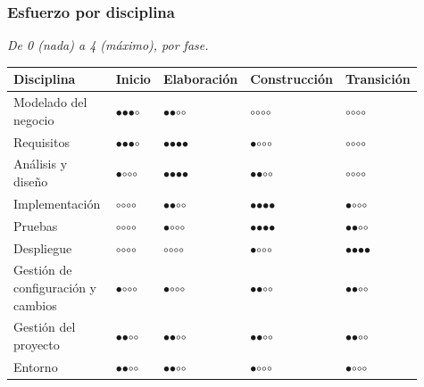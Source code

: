 \subsubsection*{Esfuerzo por disciplina}

\emph{De 0 (nada) a 4 (máximo), por fase.}

{\footnotesize\setlength{\tabcolsep}{4pt}
\begin{longtable}{@{}>{\raggedright\arraybackslash}p{0.389\linewidth}>{\raggedright\arraybackslash}p{0.079\linewidth}>{\raggedright\arraybackslash}p{0.147\linewidth}>{\raggedright\arraybackslash}p{0.166\linewidth}>{\raggedright\arraybackslash}p{0.133\linewidth}@{}}
\toprule
\textbf{Disciplina} & \textbf{Inicio} & \textbf{Elaboración} & \textbf{Construcción} & \textbf{Transición} \\
\midrule
\endhead
Modelado del negocio & $\bullet$$\bullet$$\bullet$$\circ$ & $\bullet$$\bullet$$\circ$$\circ$ & $\circ$$\circ$$\circ$$\circ$ & $\circ$$\circ$$\circ$$\circ$ \\
Requisitos & $\bullet$$\bullet$$\bullet$$\circ$ & $\bullet$$\bullet$$\bullet$$\bullet$ & $\bullet$$\circ$$\circ$$\circ$ & $\circ$$\circ$$\circ$$\circ$ \\
Análisis y diseño & $\bullet$$\circ$$\circ$$\circ$ & $\bullet$$\bullet$$\bullet$$\bullet$ & $\bullet$$\bullet$$\circ$$\circ$ & $\circ$$\circ$$\circ$$\circ$ \\
Implementación & $\circ$$\circ$$\circ$$\circ$ & $\bullet$$\bullet$$\circ$$\circ$ & $\bullet$$\bullet$$\bullet$$\bullet$ & $\bullet$$\circ$$\circ$$\circ$ \\
Pruebas & $\circ$$\circ$$\circ$$\circ$ & $\bullet$$\circ$$\circ$$\circ$ & $\bullet$$\bullet$$\bullet$$\bullet$ & $\bullet$$\bullet$$\circ$$\circ$ \\
Despliegue & $\circ$$\circ$$\circ$$\circ$ & $\circ$$\circ$$\circ$$\circ$ & $\bullet$$\circ$$\circ$$\circ$ & $\bullet$$\bullet$$\bullet$$\bullet$ \\
Gestión de configuración y cambios & $\bullet$$\circ$$\circ$$\circ$ & $\bullet$$\circ$$\circ$$\circ$ & $\bullet$$\bullet$$\circ$$\circ$ & $\bullet$$\bullet$$\circ$$\circ$ \\
Gestión del proyecto & $\bullet$$\bullet$$\circ$$\circ$ & $\bullet$$\bullet$$\circ$$\circ$ & $\bullet$$\bullet$$\circ$$\circ$ & $\bullet$$\bullet$$\circ$$\circ$ \\
Entorno & $\bullet$$\bullet$$\circ$$\circ$ & $\bullet$$\bullet$$\circ$$\circ$ & $\bullet$$\circ$$\circ$$\circ$ & $\bullet$$\circ$$\circ$$\circ$ \\
\bottomrule
\end{longtable}}

